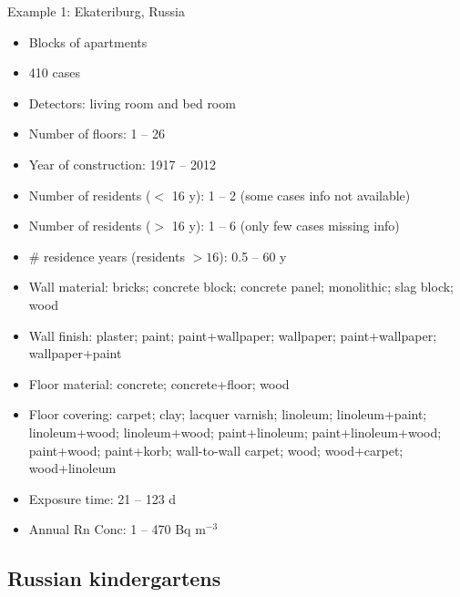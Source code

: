 \documentclass[xcolor=svgnames]{beamer}
\newcommand{\1}{\'{\i}}
\begin{document}
\begin{frame}[allowframebreaks]{Example 1: Ekateriburg, Russia}

\begin{itemize}
\item Blocks of apartments
\item 410 cases
\item Detectors: living room and bed room
\item Number of floors: 1 -- 26
\item Year of construction: 1917 -- 2012
\item Number of residents ($<$ 16 y): 1 -- 2 (some cases info not available)
\item Number of residents ($>$ 16 y): 1 -- 6 (only few cases missing info)
\item \# residence years (residents $>16$): 0.5 -- 60 y
\item Wall material: bricks; concrete block; concrete panel; monolithic; slag block; wood
\item Wall finish: plaster; paint; paint+wallpaper; wallpaper; paint+wallpaper; wallpaper+paint
\item Floor material: concrete; concrete+floor; wood
\item Floor covering: carpet; clay; lacquer varnish; linoleum; linoleum+paint; linoleum+wood; linoleum+wood; paint+linoleum; paint+linoleum+wood; paint+wood; paint+korb; wall-to-wall carpet; wood; wood+carpet; wood+linoleum
\item Exposure time: 21 -- 123 d
\item Annual Rn Conc: 1 -- 470 Bq m$^{-3}$
\end{itemize}

\end{frame}

\subsection{Russian kindergartens}
\end{document}
